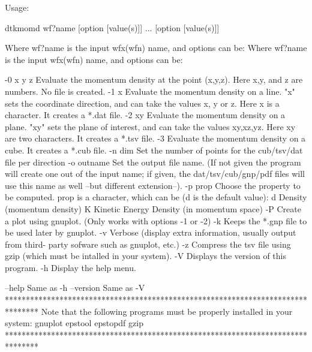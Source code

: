 Usage:

	dtkmomd wf?name [option [value(s)]] ... [option [value(s)]]

Where wf?name is the input wfx(wfn) name, and options can be:
Where wf?name is the input wfx(wfn) name, and options can be:

  -0 x y z  	Evaluate the momentum density at the point (x,y,z).
            	  Here x,y, and z are numbers. No file is created.
  -1  x     	Evaluate the momentum density on a line. "x" sets the coordinate
            	  direction, and can take the values x, y or z.
            	  Here x is a character. It creates a *.dat file.
  -2  xy    	Evaluate the momentum density on a plane. "xy" sets the plane of
            	  interest, and can take the values xy,xz,yz.
            	  Here xy are two characters. It creates a *.tsv file.
  -3        	Evaluate the momentum density on a cube.
            	  It creates a *.cub file.
  -n  dim   	Set the number of points for the cub/tsv/dat file per direction
  -o outname	Set the output file name.
            	  (If not given the program will create one out of
            	  the input name; if given, the dat/tsv/cub/gnp/pdf files will
            	  use this name as well --but different extension--).
  -p prop   	Choose the property to be computed. prop is a character,
            	  which can be (d is the default value):
            	     d Density (momentum density)
            	     K Kinetic Energy Density (in momentum space)
  -P     	Create a plot using gnuplot. (Only works with options -1 or -2)
  -k     	Keeps the *.gnp file to be used later by gnuplot.
  -v     	Verbose (display extra information, usually output from third-
         	  party sofware such as gnuplot, etc.)
  -z     	Compress the tsv file using gzip (which must be intalled
         	   in your system).
  -V        	Displays the version of this program.
  -h     	Display the help menu.

  --help    		Same as -h
  --version 		Same as -V
********************************************************************************
  Note that the following programs must be properly installed in your system:
                                    gnuplot
                                    epstool
                                    epstopdf
                                      gzip
********************************************************************************
